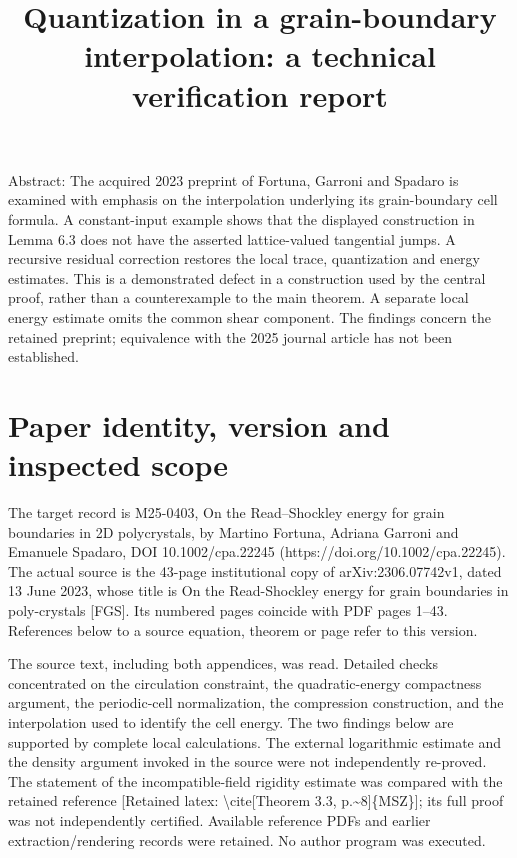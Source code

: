 \documentclass[10pt]{article}
\title{Quantization in a grain-boundary interpolation:
a technical verification report}
\author{}
\date{}
\begin{document}
\maketitle
Abstract: The acquired 2023 preprint of Fortuna, Garroni and Spadaro is examined with emphasis on the interpolation underlying its grain-boundary cell formula. A constant-input example shows that the displayed construction in Lemma 6.3 does not have the asserted lattice-valued tangential jumps. A recursive residual correction restores the local trace, quantization and energy estimates. This is a demonstrated defect in a construction used by the central proof, rather than a counterexample to the main theorem. A separate local energy estimate omits the common shear component. The findings concern the retained preprint; equivalence with the 2025 journal article has not been established.\par
\section*{Paper identity, version and inspected scope}
The target record is M25-0403, On the Read–Shockley energy for grain boundaries in 2D polycrystals, by Martino Fortuna, Adriana Garroni and Emanuele Spadaro, DOI 10.1002/cpa.22245 (https://doi.org/10.1002/cpa.22245). The actual source is the 43-page institutional copy of arXiv:2306.07742v1, dated 13 June 2023, whose title is On the Read-Shockley energy for grain boundaries in poly-crystals [FGS]. Its numbered pages coincide with PDF pages 1–43. References below to a source equation, theorem or page refer to this version.\par
The source text, including both appendices, was read. Detailed checks concentrated on the circulation constraint, the quadratic-energy compactness argument, the periodic-cell normalization, the compression construction, and the interpolation used to identify the cell energy. The two findings below are supported by complete local calculations. The external logarithmic estimate and the density argument invoked in the source were not independently re-proved. The statement of the incompatible-field rigidity estimate was compared with the retained reference [Retained latex: \textbackslash{}cite[Theorem 3.3, p.\textasciitilde{}8]\{MSZ\}]; its full proof was not independently certified. Available reference PDFs and earlier extraction/rendering records were retained. No author program was executed.\par
\end{document}
